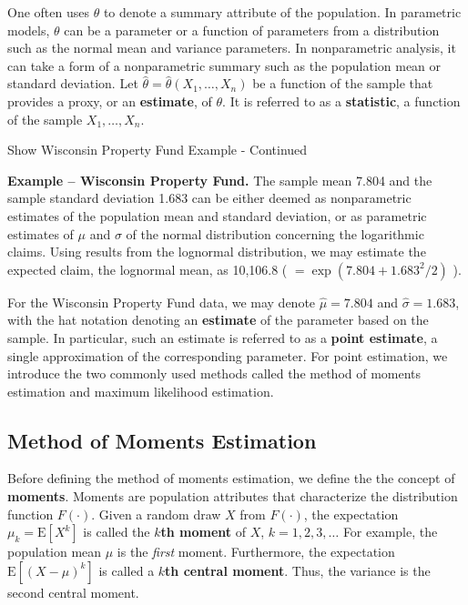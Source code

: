 \documentclass[]{book}
\theoremstyle{definition}
\theoremstyle{definition}
\theoremstyle{definition}
\theoremstyle{remark}
\begin{document}
One often uses \(\theta\) to denote a summary attribute of the
population. In parametric models, \(\theta\) can be a parameter or a
function of parameters from a distribution such as the normal mean and
variance parameters. In nonparametric analysis, it can take a form of a
nonparametric summary such as the population mean or standard deviation.
Let \(\hat{\theta} =\hat{\theta}(X_1, \ldots, X_n)\) be a function of
the sample that provides a proxy, or an \textbf{estimate}, of
\(\theta\). It is referred to as a \textbf{statistic}, a function of the
sample \(X_1, \ldots, X_n\).

Show Wisconsin Property Fund Example - Continued

\hypertarget{EXM:S1:PE}{}
\textbf{Example -- Wisconsin Property Fund.} The sample mean 7.804 and
the sample standard deviation 1.683 can be either deemed as
nonparametric estimates of the population mean and standard deviation,
or as parametric estimates of \(\mu\) and \(\sigma\) of the normal
distribution concerning the logarithmic claims. Using results from the
lognormal distribution, we may estimate the expected claim, the
lognormal mean, as 10,106.8 ( \(=\exp(7.804+1.683^2/2)\) ).

For the Wisconsin Property Fund data, we may denote \(\hat{\mu} =7.804\)
and \(\hat{\sigma} = 1.683\), with the hat notation denoting an
\textbf{estimate} of the parameter based on the sample. In particular,
such an estimate is referred to as a \textbf{point estimate}, a single
approximation of the corresponding parameter. For point estimation, we
introduce the two commonly used methods called the method of moments
estimation and maximum likelihood estimation.

\subsection{Method of Moments
Estimation}\label{method-of-moments-estimation}

Before defining the method of moments estimation, we define the the
concept of \textbf{moments}. Moments are population attributes that
characterize the distribution function \(F(\cdot)\). Given a random draw
\(X\) from \(F(\cdot)\), the expectation \(\mu_k=\mathrm{E}[X^k]\) is
called the \textbf{\(k\)th moment} of \(X\), \(k=1,2,3,\ldots\) For
example, the population mean \(\mu\) is the \emph{first} moment.
Furthermore, the expectation \(\mathrm{E}[(X-\mu)^k]\) is called a
\textbf{\(k\)th central moment}. Thus, the variance is the second
central moment.
\end{document}
